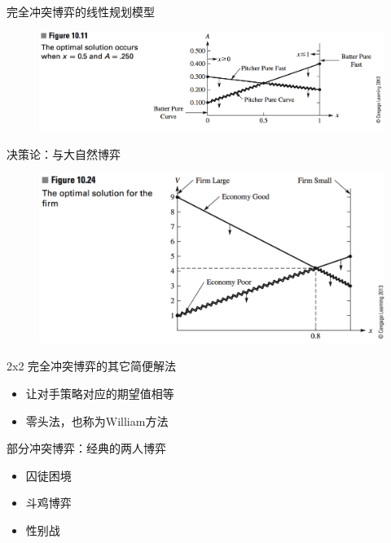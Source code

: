 \documentclass[UTF8]{ctexbeamer}
\begin{document}
\begin{frame}{完全冲突博弈的线性规划模型}
  
  \begin{figure}
    \includegraphics[width=\textwidth{}]{linear.png}
  \end{figure}

\end{frame}

\begin{frame}{决策论：与大自然博弈}
  
  \begin{figure}
    \includegraphics[width=\textwidth{}]{nature.png}
  \end{figure}

\end{frame}

\begin{frame}{2x2 完全冲突博弈的其它简便解法}

  \begin{itemize}
  \item 让对手策略对应的期望值相等
  \item 零头法，也称为William方法
  \end{itemize}
  
\end{frame}

\begin{frame}{部分冲突博弈：经典的两人博弈}
  \begin{itemize}
  \item 囚徒困境
  \item 斗鸡博弈
  \item 性别战
  \end{itemize}
  
\end{frame}
\end{document}
